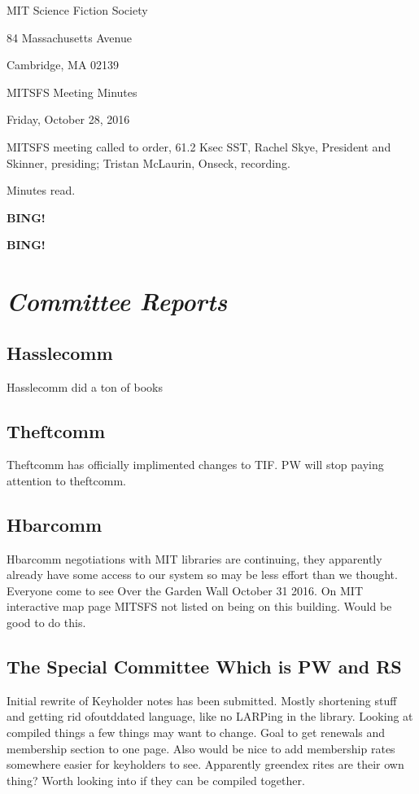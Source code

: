 \documentclass[10pt]{article}
\newcommand{\bing}{{\bf BING!} }
\newcommand{\goto}[1]{\bing \vskip 12pt \section*{{\em{#1}}}}
\newcommand{\skinner}{Rachel Skye, President and Skinner}
\newcommand{\onseck}{Tristan McLaurin, Onseck}
\newcommand{\meetingdate}{Friday, October 28, 2016}
\begin{document}
\begin{center}

MIT Science Fiction Society

84 Massachusetts Avenue

Cambridge, MA 02139

\vspace{12pt}

MITSFS Meeting Minutes

\meetingdate

\end{center}

\vspace{18pt}

\setlength{\parskip}{6pt}

\noindent
MITSFS meeting called to order, 61.2 Ksec SST,
\skinner, presiding; \onseck, recording.

Minutes read.

\bing

\goto{Committee Reports}
\subsection*{Hasslecomm}
Hasslecomm did a ton of books

\subsection*{Theftcomm}
Theftcomm has officially implimented changes to TIF. PW will stop paying attention to theftcomm.

\subsection*{Hbarcomm}
Hbarcomm negotiations with MIT libraries are continuing, they apparently already have some access to our system so may be less effort than we thought. 
Everyone come to see Over the Garden Wall October 31 2016.
On MIT interactive map page MITSFS not listed on being on this building. Would be good to do this.

\subsection*{The Special Committee Which is PW and RS}
Initial rewrite of Keyholder notes has been submitted. Mostly shortening stuff and getting rid ofoutddated language, like no LARPing in the library. Looking at compiled things a few things may want to change. Goal to get renewals and membership section to one page. Also would be nice to add membership rates somewhere easier for keyholders to see. Apparently greendex rites are their own thing? Worth looking into if they can be compiled together. 
\end{document}

